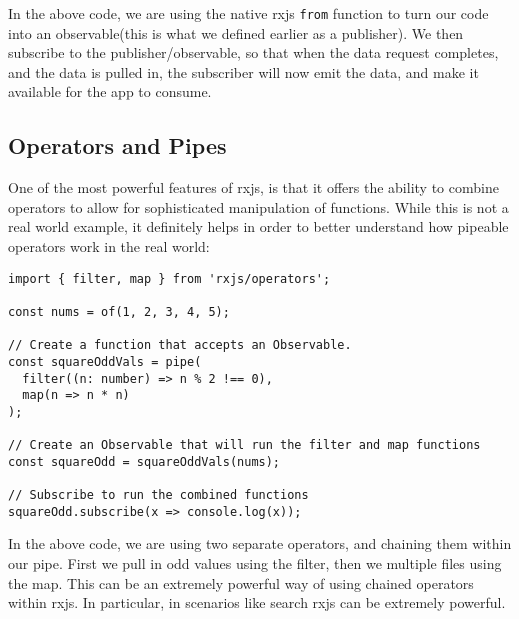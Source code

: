 
In the above code, we are using the native rxjs \lstinline{from} function to
turn our code into an observable(this is what we defined earlier as a 
publisher). We then subscribe to the publisher/observable, so that when the 
data request completes, and the data is pulled in, the subscriber will now 
emit the data, and make it available for the app to consume. 

\subsection{ Operators and Pipes }
One of the most powerful features of rxjs, is that it offers the ability to 
combine operators to allow for sophisticated manipulation of functions. While 
this is not a real world example, it definitely helps in order to better 
understand how pipeable operators work in the real world: 
\begin{lstlisting}
import { filter, map } from 'rxjs/operators';

const nums = of(1, 2, 3, 4, 5);
  
// Create a function that accepts an Observable.
const squareOddVals = pipe(
  filter((n: number) => n % 2 !== 0),
  map(n => n * n)
);  

// Create an Observable that will run the filter and map functions
const squareOdd = squareOddVals(nums);
 
// Subscribe to run the combined functions
squareOdd.subscribe(x => console.log(x));
\end{lstlisting}

In the above code, we are using two separate operators, and chaining them 
within our pipe. First we pull in odd values using the filter, then we 
multiple files using the map. This can be an extremely powerful way of 
using chained operators within rxjs. In particular, in scenarios like search
rxjs can be extremely powerful. 





